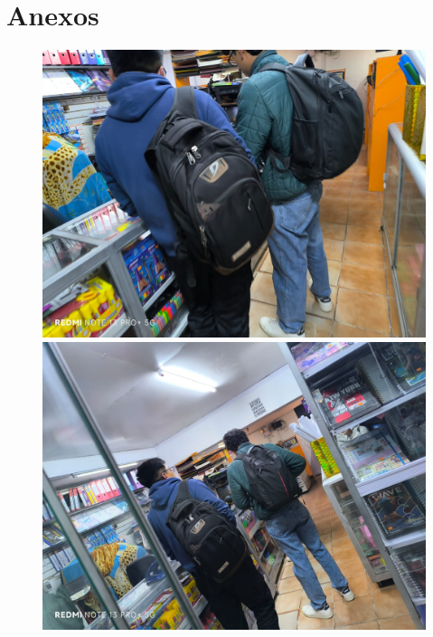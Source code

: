 \documentclass[12pt]{article}
\begin{document}
 \section{Anexos}
\begin{figure}[htbp]
\centering

\begin{minipage}[b]{0.48\textwidth}
  \centering
  \includegraphics[width=\textwidth]{1.jpeg}
  
\end{minipage}
\hfill
\begin{minipage}[b]{0.48\textwidth}
  \centering
  \includegraphics[width=\textwidth]{2.jpeg}
 
\end{minipage}


\end{figure}
\end{document}
